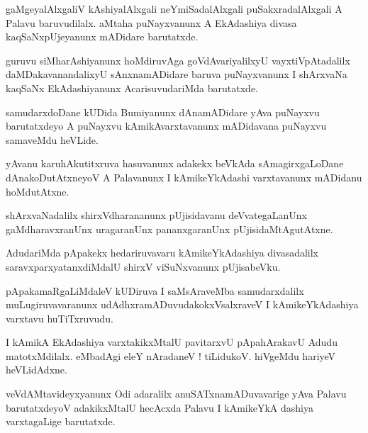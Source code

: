 \documentclass{article}
\begin{document}
\begin{mn}%
gaMgeyalAlxgaliV kAshiyalAlxgali neYmiSadalAlxgali puSakxradalAlxgali A Palavu baruvudilalx. aMtaha 
puNayxvanunx A EkAdashiya divasa kaqSaNxpUjeyanunx mADidare barutatxde.
\end{mn}

\begin{mn}%
guruvu siMharAshiyanunx hoMdiruvAga goVdAvariyalilxyU vayxtiVpAtadalilx daMDakavanandalixyU 
sAnxnamADidare baruva puNayxvanunx I shArxvaNa kaqSaNx EkAdashiyanunx AcarisuvudariMda barutatxde.
\end{mn}

\begin{mn}%
samudarxdoDane kUDida Bumiyanunx dAnamADidare yAva puNayxvu barutatxdeyo A puNayxvu 
kAmikAvarxtavanunx mADidavana puNayxvu samaveMdu heVLide.
\end{mn}

\begin{mn}%
yAvanu karuhAkutitxruva hasuvanunx adakekx beVkAda sAmagirxgaLoDane dAnakoDutAtxneyoV A Palavanunx 
I kAmikeYkAdashi varxtavanunx mADidanu hoMdutAtxne.
\end{mn}

\begin{mn}%
shArxvaNadalilx shirxVdharananunx pUjisidavanu deVvategaLanUnx gaMdharavxranUnx uragaranUnx 
pananxgaranUnx pUjisidaMtAgutAtxne.
\end{mn}

\begin{mn}%
AdudariMda pApakekx hedariruvavaru kAmikeYkAdashiya divasadalilx saravxparxyatanxdiMdalU shirxV 
viSuNxvanunx pUjisabeVku.
\end{mn}

\begin{mn}%
pApakamaRgaLiMdaleV kUDiruva I saMsAraveMba samudarxdalilx muLugiruvavaranunx 
udAdhxramADuvudakokxVsalxraveV I kAmikeYkAdashiya varxtavu huTiTxruvudu.
\end{mn}

\begin{mn}%
I kAmikA EkAdashiya varxtakikxMtalU pavitarxvU pApahArakavU Adudu matotxMdilalx. eMbadAgi eleY 
nAradaneV ! tiLidukoV. hiVgeMdu hariyeV heVLidAdxne.
\end{mn}

\begin{mn}%
veVdAMtavideyxyanunx Odi adaralilx anuSATxnamADuvavarige yAva Palavu barutatxdeyoV adakikxMtalU 
hecAcxda Palavu I kAmikeYkA dashiya varxtagaLige barutatxde.
\end{mn}
\end{document}

